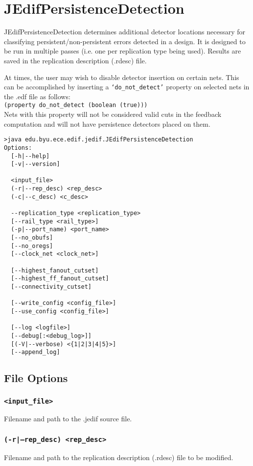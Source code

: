 \section{JEdifPersistenceDetection}
JEdifPersistenceDetection determines additional detector locations necessary
for classifying persistent/non-persistent errors detected in a design. It is
designed to be run in multiple passes (i.e. one per replication type being
used). Results are saved in the replication description (.rdesc) file.

At times, the user may wish to disable detector insertion on certain nets. This
can be accomplished by inserting a \texttt{`do\_not\_detect'} property on
selected nets in the .edf file as follows:\\
\texttt{(property do\_not\_detect (boolean (true)))}\\

Nets with this property will not be considered valid cuts in the feedback
computation and will not have persistence detectors placed on them.

\begin{verbatim}
>java edu.byu.ece.edif.jedif.JEdifPersistenceDetection
Options:
  [-h|--help]
  [-v|--version]

  <input_file>
  (-r|--rep_desc) <rep_desc>
  (-c|--c_desc) <c_desc>

  --replication_type <replication_type>
  [--rail_type <rail_type>]
  (-p|--port_name) <port_name>
  [--no_obufs]
  [--no_oregs]
  [--clock_net <clock_net>]

  [--highest_fanout_cutset]
  [--highest_ff_fanout_cutset]
  [--connectivity_cutset]

  [--write_config <config_file>]
  [--use_config <config_file>]

  [--log <logfile>]
  [--debug[:<debug_log>]]
  [(-V|--verbose) <{1|2|3|4|5}>]
  [--append_log]
\end{verbatim}
\subsection{File Options}

\subsubsection{\texttt{<input\_file>}}
Filename and path to the .jedif source file.

\subsubsection{\texttt{(-r|--rep\_desc) <rep\_desc>}}
Filename and path to the replication description (.rdesc) file to be modified.

